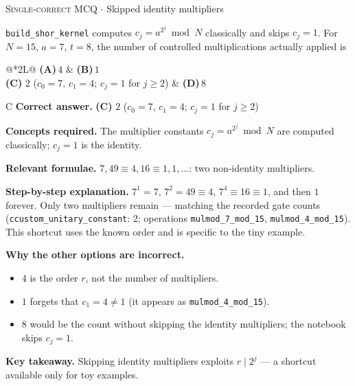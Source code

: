 \documentclass[11pt,a4paper]{article}
\newcommand{\optlabel}[1]{\textbf{(#1)}}
\newcommand{\correctlabel}[1]{\textcolor{okgreen}{\textbf{(#1)}\,\ding{51}}}
\newenvironment{qitem}[1]{\begin{list}{}{\setlength{\leftmargin}{3.3em}\setlength{\labelwidth}{3.1em}%
  \setlength{\labelsep}{0.2em}\setlength{\topsep}{3pt}\setlength{\parsep}{3pt}}\item[\textbf{Q.#1}\hfill]}{\end{list}}
\newcommand{\qsep}{\par\vspace{2pt}{\color{black!15}\hrule}\vspace{4pt}}
\newcommand{\qmeta}[2]{{\footnotesize\color{black!60}\textsc{#1} \;$\cdot$\; #2}\par}
\begin{document}
\begin{qitem}{54}
\qmeta{Single-correct MCQ}{Skipped identity multipliers}
\texttt{build\_shor\_kernel} computes $c_j = a^{2^j} \bmod N$ classically and skips $c_j = 1$. For $N = 15$, $a = 7$, $t = 8$, the number of controlled
multiplications actually applied is
\par\smallskip\noindent\begin{tabularx}{\linewidth}{@{}*{2}{L}@{}}
\optlabel{A}\,$4$ & \optlabel{B}\,$1$ \\[3pt]
\correctlabel{C}\,$2$ ($c_0 = 7$, $c_1 = 4$; $c_j = 1$ for $j \ge 2$) & \optlabel{D}\,$8$
\end{tabularx}
\end{qitem}
\begin{solbox}{C}
\textbf{\color{brand}Correct answer.} \textcolor{okgreen}{\textbf{(C)}} $2$ ($c_0 = 7$, $c_1 = 4$; $c_j = 1$ for $j \ge 2$)

\textbf{\color{brand}Concepts required.} The multiplier constants $c_j = a^{2^j} \bmod N$ are computed classically; $c_j = 1$ is the identity.

\textbf{\color{brand}Relevant formulae.} $7, 49 \equiv 4, 16 \equiv 1, 1, \dots$: two non-identity multipliers.

\textbf{\color{brand}Step-by-step explanation.} $7^1 = 7$, $7^2 = 49 \equiv 4$, $7^4 \equiv 16 \equiv 1$, and then $1$ forever. Only two multipliers remain --- matching the recorded gate counts
(\texttt{ccustom\_unitary\_constant}: 2; operations \texttt{mulmod\_7\_mod\_15}, \texttt{mulmod\_4\_mod\_15}). This shortcut uses the known order and is
specific to the tiny example.

\textbf{\color{brand}Why the other options are incorrect.}
\begin{itemize}[leftmargin=2.4em, itemsep=1pt, topsep=2pt]
\item[\textbf{(A)}] $4$ is the order $r$, not the number of multipliers.
\item[\textbf{(B)}] $1$ forgets that $c_1 = 4 \ne 1$ (it appears as \texttt{mulmod\_4\_mod\_15}).
\item[\textbf{(D)}] $8$ would be the count without skipping the identity multipliers; the notebook skips $c_j = 1$.
\end{itemize}
\textbf{\color{brand}Key takeaway.} Skipping identity multipliers exploits $r \mid 2^j$ --- a shortcut available only for toy examples.
\end{solbox}
\qsep
\end{document}
